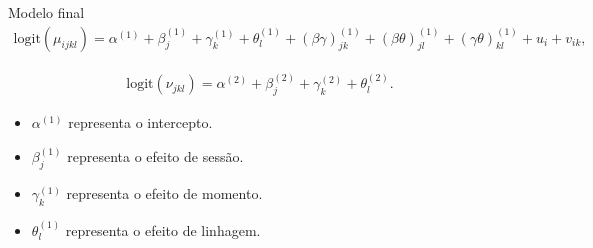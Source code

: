 \documentclass[
  ignorenonframetext,
  serif,
  professionalfont,
  usenames,
  dvipsnames,
  aspectratio = 169]{beamer}
\providecommand{\tightlist}{%
  \setlength{\itemsep}{0pt}\setlength{\parskip}{0pt}}
\renewcommand{\tightlist}{%
  \setlength{\itemsep}{0\baselineskip}
  \setlength{\parskip}{0.25\baselineskip}
}
\begin{document}
\begin{frame}{Modelo final}
\protect\hypertarget{modelo-final-1}{}
\begin{equation}
    \begin{aligned}
        \text{logit}(\mu_{ijkl}) = \alpha^{(1)} + \beta_{j}^{(1)} + \gamma_{k}^{(1)} + \theta_{l}^{(1)} + (\beta\gamma)_{jk}^{(1)} + (\beta\theta)_{jl}^{(1)} + (\gamma\theta)_{kl}^{(1)} + u_{i} + v_{ik},
    \end{aligned}
    \label{eq.prop.mu}
\end{equation}

\begin{equation}
    \begin{aligned}
        \text{logit}(\nu_{jkl}) = \alpha^{(2)} + \beta_{j}^{(2)} + \gamma_{k}^{(2)} + \theta_{l}^{(2)}.
    \end{aligned}
    \label{eq.prop.nu}
\end{equation}

\begin{itemize}
\tightlist
\item
  \(\alpha^{(1)}\) representa o intercepto.
\item
  \(\beta_{j}^{(1)}\) representa o efeito de sessão.
\item
  \(\gamma_{k}^{(1)}\) representa o efeito de momento.
\item
  \(\theta_{l}^{(1)}\) representa o efeito de linhagem.
\end{itemize}
\end{frame}
\end{document}
